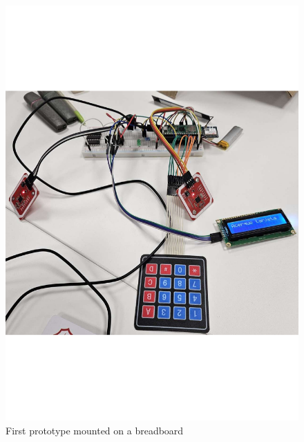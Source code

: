 \begin{figure}[h]
    \centering
    \begin{minipage}[b]{0.45\textwidth}
        \centering
        \includegraphics[width=1\textwidth]{Imagenes/Vectorial/breadboard1.pdf}
        \caption{First prototype mounted on a breadboard}
        \label{fig:breadboard1}
    \end{minipage}
    \hfill
    \begin{minipage}[b]{0.45\textwidth}
        \centering

\end{minipage}
\end{figure}

